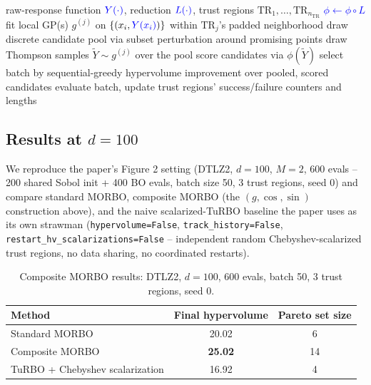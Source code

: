 \documentclass[11pt]{article}
\newcommand{\TR}{\mathrm{TR}}
\begin{document}
\begin{algorithm}[h]
\caption{Composite MORBO (differences from standard MORBO in \textcolor{blue}{blue})}
\begin{algorithmic}[1]
\Require raw-response function $\textcolor{blue}{Y(\cdot)}$, reduction $\textcolor{blue}{L(\cdot)}$, trust regions $\TR_1,\dots,\TR_{n_\TR}$
\State \textcolor{blue}{$\phi \gets \phi \circ L$} 
  \For{each trust region $\TR_j$}
    \State fit local GP(s) $g^{(j)}$ on $\{(x_i, \textcolor{blue}{Y(x_i)})\}$ within $\TR_j$'s padded neighborhood
    \State draw discrete candidate pool via subset perturbation around promising points
    \State draw Thompson samples $\tilde Y \sim g^{(j)}$ over the pool
    \State score candidates via $\phi(\tilde Y)$ 
  \EndFor
  \State select batch by sequential-greedy hypervolume improvement over pooled, scored candidates
  \State evaluate batch, update trust regions' success/failure counters and lengths
\EndFor
\end{algorithmic}
\end{algorithm}

\subsection{Results at $d=100$}

We reproduce the paper's Figure 2 setting (DTLZ2, $d=100$, $M=2$, 600 evals
-- 200 shared Sobol init + 400 BO evals, batch size 50, 3 trust regions,
seed 0) and compare standard MORBO, composite MORBO (the $(g,\cos,\sin)$
construction above), and the naive scalarized-TuRBO baseline the paper uses
as its own strawman (\texttt{hypervolume=False},
\texttt{track\_history=False}, \texttt{restart\_hv\_scalarizations=False} --
independent random Chebyshev-scalarized trust regions, no data sharing, no
coordinated restarts).

\begin{table}[h]
\centering
\caption{Composite MORBO results: DTLZ2, $d=100$, 600 evals, batch 50, 3 trust regions, seed 0.}
\label{tab:composite-fig2-results}
\begin{tabular}{lcc}
\toprule
Method & Final hypervolume & Pareto set size \\
\midrule
Standard MORBO & 20.02 & 6 \\
Composite MORBO & \textbf{25.02} & 14 \\
TuRBO + Chebyshev scalarization & 16.92 & 4 \\
\bottomrule
\end{tabular}
\end{table}
\end{document}
